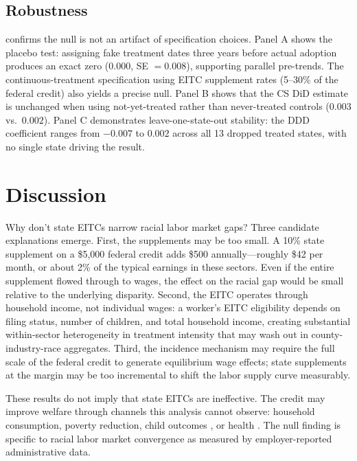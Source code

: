 \documentclass[12pt]{article}
\begin{document}
\subsection{Robustness}



 confirms the null is not an artifact of specification choices. Panel A shows the placebo test: assigning fake treatment dates three years before actual adoption produces an exact zero ($0.000$, SE $= 0.008$), supporting parallel pre-trends. The continuous-treatment specification using EITC supplement rates (5--30\% of the federal credit) also yields a precise null. Panel B shows that the CS DiD estimate is unchanged when using not-yet-treated rather than never-treated controls ($0.003$ vs.\ $0.002$). Panel C demonstrates leave-one-state-out stability: the DDD coefficient ranges from $-0.007$ to $0.002$ across all 13 dropped treated states, with no single state driving the result.

\section{Discussion}

Why don't state EITCs narrow racial labor market gaps? Three candidate explanations emerge. First, the supplements may be too small. A 10\% state supplement on a \$5,000 federal credit adds \$500 annually---roughly \$42 per month, or about 2\% of the typical earnings in these sectors. Even if the entire supplement flowed through to wages, the effect on the racial gap would be small relative to the underlying disparity. Second, the EITC operates through household income, not individual wages: a worker's EITC eligibility depends on filing status, number of children, and total household income, creating substantial within-sector heterogeneity in treatment intensity that may wash out in county-industry-race aggregates. Third, the \citet{rothstein2010} incidence mechanism may require the full scale of the federal credit to generate equilibrium wage effects; state supplements at the margin may be too incremental to shift the labor supply curve measurably.

These results do not imply that state EITCs are ineffective. The credit may improve welfare through channels this analysis cannot observe: household consumption, poverty reduction, child outcomes \citep{dahl2012, hoynes2018}, or health \citep{bastian2021}. The null finding is specific to racial labor market convergence as measured by employer-reported administrative data.
\end{document}
